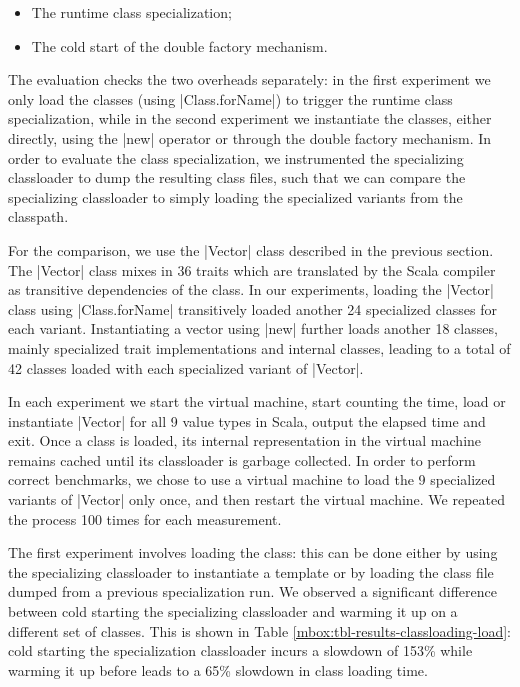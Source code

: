 \begin{itemize}
  \item The runtime class specialization;
  \item The cold start of the double factory mechanism.
\end{itemize}

The evaluation checks the two overheads separately: in the first experiment we only load the classes (using |Class.forName|) to trigger the runtime class specialization, while in the second experiment we instantiate the classes, either directly, using the |new| operator or through the double factory mechanism. In order to evaluate the class specialization, we instrumented the specializing classloader to dump the resulting class files, such that we can compare the specializing classloader to simply loading the specialized variants from the classpath.

For the comparison, we use the |Vector| class described in the previous section. The |Vector| class mixes in 36 traits \cite{scalable-component-abstractions} which are translated by the Scala compiler as transitive dependencies of the class. In our experiments, loading the |Vector| class using |Class.forName| transitively loaded another 24 specialized classes for each variant. Instantiating a vector using |new| further loads another 18 classes, mainly specialized trait implementations and internal classes, leading to a total of 42 classes loaded with each specialized variant of |Vector|.

In each experiment we start the virtual machine, start counting the time, load or instantiate |Vector| for all 9 value types in Scala, output the elapsed time and exit. Once a class is loaded, its internal representation in the virtual machine remains cached until its classloader is garbage collected. In order to perform correct benchmarks, we chose to use a virtual machine to load the 9 specialized variants of |Vector| only once, and then restart the virtual machine. We repeated the process 100 times for each measurement.

The first experiment involves loading the class: this can be done either by using the specializing classloader to instantiate a template or by loading the class file dumped from a previous specialization run. We observed a significant difference between cold starting the specializing classloader and warming it up on a different set of classes. This is shown in Table \ref{mbox:tbl-results-classloading-load}: cold starting the specialization classloader incurs a slowdown of 153\% while warming it up before leads to a 65\% slowdown in class loading time.

